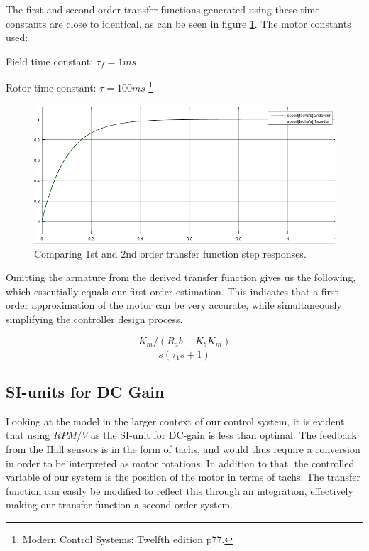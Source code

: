 The first and second order transfer functions generated using these time constants are close to identical, as can be seen in figure \ref{fig:1st2ndorderstep}. The motor constants used:

Field time constant: $\tau_f = 1ms$ 

Rotor time constant: $\tau = 100ms$ \footnote{Modern Control Systems: Twelfth edition p77.} 

\begin{figure}[h!]
\centering
\includegraphics[scale=0.6]{Billeder/1st2ndorderstep.png}
\caption{Comparing 1st and 2nd order transfer function step responses.}
\label{fig:1st2ndorderstep}
\end{figure}

Omitting the armature from the derived transfer function gives us the following, which essentially equals our first order estimation. This indicates that a first order approximation of the motor can be very accurate, while simultaneously simplifying the controller design process.

\begin{equation}
\frac{K_m /(R_a b+K_b K_m )}{s(\tau_1 s +1)}
\end{equation}

\subsection{SI-units for DC Gain}
Looking at the model in the larger context of our control system, it is evident that using $RPM/V$ as the SI-unit for DC-gain is less than optimal. The feedback from the Hall sensors is in the form of tachs, and would thus require a conversion in order to be interpreted as motor rotations. In addition to that, the controlled variable of our system is the position of the motor in terms of tachs. The transfer function can easily be modified to reflect this through an integration, effectively making our transfer function a second order system.


